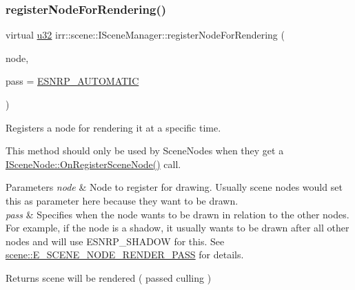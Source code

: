 \subsubsection{\texorpdfstring{register\+Node\+For\+Rendering()}{registerNodeForRendering()}\hspace{0.1cm}{\footnotesize\ttfamily [1/2]}}
{\footnotesize\ttfamily virtual \hyperlink{namespaceirr_a0416a53257075833e7002efd0a18e804}{u32} irr\+::scene\+::\+I\+Scene\+Manager\+::register\+Node\+For\+Rendering (\begin{DoxyParamCaption}\item[{\hyperlink{classirr_1_1scene_1_1ISceneNode}{I\+Scene\+Node} $\ast$}]{node,  }\item[{\hyperlink{namespaceirr_1_1scene_a7862269bd1abc123929d4dbb8200d67f}{E\+\_\+\+S\+C\+E\+N\+E\+\_\+\+N\+O\+D\+E\+\_\+\+R\+E\+N\+D\+E\+R\+\_\+\+P\+A\+SS}}]{pass = {\ttfamily \hyperlink{namespaceirr_1_1scene_a7862269bd1abc123929d4dbb8200d67fad9a67a121247bc1001e35b8a8c0ef20d}{E\+S\+N\+R\+P\+\_\+\+A\+U\+T\+O\+M\+A\+T\+IC}} }\end{DoxyParamCaption})\hspace{0.3cm}{\ttfamily [pure virtual]}}



Registers a node for rendering it at a specific time. 

This method should only be used by Scene\+Nodes when they get a \hyperlink{classirr_1_1scene_1_1ISceneNode_ac9795bfcb88dcaf8cba6ea3296e5d8d0}{I\+Scene\+Node\+::\+On\+Register\+Scene\+Node()} call. 
\begin{DoxyParams}{Parameters}
{\em node} & Node to register for drawing. Usually scene nodes would set \textquotesingle{}this\textquotesingle{} as parameter here because they want to be drawn. \\
\hline
{\em pass} & Specifies when the node wants to be drawn in relation to the other nodes. For example, if the node is a shadow, it usually wants to be drawn after all other nodes and will use E\+S\+N\+R\+P\+\_\+\+S\+H\+A\+D\+OW for this. See \hyperlink{namespaceirr_1_1scene_a7862269bd1abc123929d4dbb8200d67f}{scene\+::\+E\+\_\+\+S\+C\+E\+N\+E\+\_\+\+N\+O\+D\+E\+\_\+\+R\+E\+N\+D\+E\+R\+\_\+\+P\+A\+SS} for details. \\
\hline
\end{DoxyParams}
\begin{DoxyReturn}{Returns}
scene will be rendered ( passed culling ) 
\end{DoxyReturn}
\mbox{\label{classirr_1_1scene_1_1ISceneManager_aaf17bdde6d4e9ef61a76f3b43100ecb8}} 

